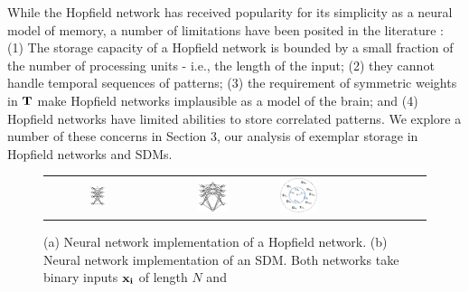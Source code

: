 \documentclass[10pt,letterpaper]{article}
\begin{document}
While the Hopfield network has received popularity for its simplicity as a neural model of memory, a number of limitations have been posited in the literature \cite{Keeler1988}: (1) The storage capacity of a Hopfield network is bounded by a small fraction of the number of processing units - i.e., the length of the input; (2) they cannot handle temporal sequences of patterns; (3) the requirement of symmetric weights in $\bf{T}$ make Hopfield networks  implausible as a model of the brain; and (4) Hopfield networks have limited abilities to store correlated patterns. We explore a number of these concerns in Section 3, our analysis of exemplar storage in Hopfield networks and SDMs.

\begin{figure}[h!]
  \begin{center}
    \begin{tabular}{lclclc}
      \raisebox{1.6in}{(a)} &
      \includegraphics[width=0.23\textwidth]{./figures/hopfieldNetwork.png} &
      \raisebox{1.6in}{(b)} &
      \includegraphics[width=0.27\textwidth]{./figures/sdmNetwork.png} 
      \raisebox{1.6in}{(c)} &
      \includegraphics[width=0.29\textwidth]{./figures/sdmOperations.png} &
    \end{tabular}
    \caption{(a) Neural network implementation of a Hopfield
      network. (b) Neural network implementation of an SDM. Both
      networks take binary inputs $\bf{x}_{i}$ of length $N$ and
}
\end{center}
\end{figure}
\end{document}
